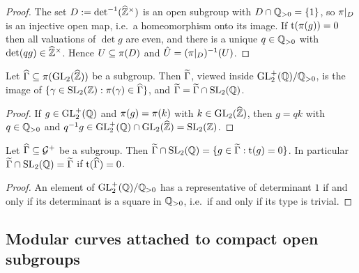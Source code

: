 \begin{proof}
The set $D := \det^{-1}(\widehat{\mathbb{Z}}^{\times})$ is an open subgroup with
$D \cap \mathbb{Q}_{>0} = \{1\}$, so $\pi|_{D}$ is an
injective open map, i.e.\ a homeomorphism onto its image. If
$\mathrm{t}(\pi(g)) = 0$ then all valuations of $\det g$ are
even, and there is a unique $q \in \mathbb{Q}_{>0}$ with
$\det(qg) \in \widehat{\mathbb{Z}}^{\times}$. Hence $U \subseteq \pi(D)$
and $\hat U = (\pi|_{D})^{-1}(U)$.
\end{proof}

\begin{lemma}
\label{lem:rational-points-glzhat}
Let $\adelic{\Gamma} \subseteq \AdelicProjection(\GL{2}{\ProfiniteIntegers})$
be a subgroup. Then $\widetilde{\Gamma}$, viewed inside $\mathrm{GL}_{2}^{+}(\mathbb{Q})/\mathbb{Q}_{>0}$,
is the image of
$\{\gamma \in \SL{2}{\ZZ} : \AdelicProjection(\gamma) \in \adelic{\Gamma}\}$,
and $\lifted{\Gamma} = \slversion{\Gamma}$.
\end{lemma}

\begin{proof}
If $g \in \mathrm{GL}_{2}^{+}(\mathbb{Q})$ and $\pi(g) = \pi(k)$
with $k \in \GL{2}{\ProfiniteIntegers}$, then $g = qk$ with
$q \in \mathbb{Q}_{>0}$ and $q^{-1}g \in \GLplus{2}{\QQ}\cap\GL{2}{\ProfiniteIntegers}
= \SL{2}{\ZZ}$.
\end{proof}

\begin{lemma}
\label{lem:sl-version-type-trivial}
Let $\widehat{\Gamma} \subseteq \mathcal{G}^{+}$ be a subgroup. Then
$\slversion{\Gamma} = \{g \in \lifted{\Gamma} : \TypeMap(g) = 0\}$. In
particular $\slversion{\Gamma} = \lifted{\Gamma}$ if $\mathrm{t}(\widehat{\Gamma}) = 0$.
\end{lemma}

\begin{proof}
An element of $\mathrm{GL}_{2}^{+}(\mathbb{Q})/\mathbb{Q}_{>0}$ has a representative of determinant $1$
if and only if its determinant is a square in $\mathbb{Q}_{>0}$, i.e.\ if
and only if its type is trivial.
\end{proof}

\subsection{Modular curves attached to compact open subgroups}

